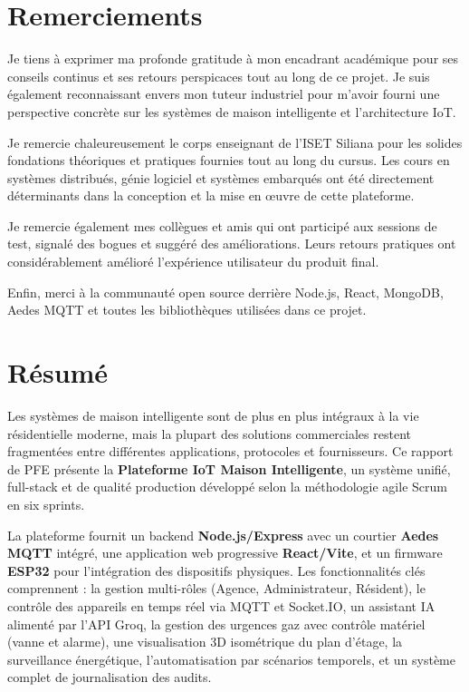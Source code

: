 \documentclass[12pt,a4paper,oneside]{report}
\begin{document}
\chapter*{Remerciements}
Je tiens à exprimer ma profonde gratitude à mon encadrant académique pour ses conseils continus et ses retours perspicaces tout au long de ce projet. Je suis également reconnaissant envers mon tuteur industriel pour m'avoir fourni une perspective concrète sur les systèmes de maison intelligente et l'architecture IoT.

Je remercie chaleureusement le corps enseignant de l'ISET Siliana pour les solides fondations théoriques et pratiques fournies tout au long du cursus. Les cours en systèmes distribués, génie logiciel et systèmes embarqués ont été directement déterminants dans la conception et la mise en \oe{}uvre de cette plateforme.

Je remercie également mes collègues et amis qui ont participé aux sessions de test, signalé des bogues et suggéré des améliorations. Leurs retours pratiques ont considérablement amélioré l'expérience utilisateur du produit final.

Enfin, merci à la communauté open source derrière Node.js, React, MongoDB, Aedes MQTT et toutes les bibliothèques utilisées dans ce projet.

\chapter*{Résumé}
Les systèmes de maison intelligente sont de plus en plus intégraux à la vie résidentielle moderne, mais la plupart des solutions commerciales restent fragmentées entre différentes applications, protocoles et fournisseurs. Ce rapport de PFE présente la \textbf{Plateforme IoT Maison Intelligente}, un système unifié, full-stack et de qualité production développé selon la méthodologie agile Scrum en six sprints.

La plateforme fournit un backend \textbf{Node.js/Express} avec un courtier \textbf{Aedes MQTT} intégré, une application web progressive \textbf{React/Vite}, et un firmware \textbf{ESP32} pour l'intégration des dispositifs physiques. Les fonctionnalités clés comprennent : la gestion multi-rôles (Agence, Administrateur, Résident), le contrôle des appareils en temps réel via MQTT et Socket.IO, un assistant IA alimenté par l'API Groq, la gestion des urgences gaz avec contrôle matériel (vanne et alarme), une visualisation 3D isométrique du plan d'étage, la surveillance énergétique, l'automatisation par scénarios temporels, et un système complet de journalisation des audits.
\end{document}

